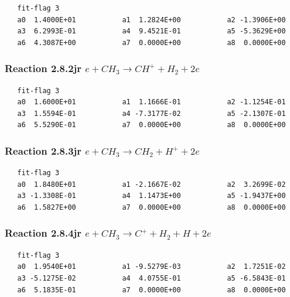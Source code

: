 \documentclass[12pt,dvipdfmx]{article}
\begin{document}
\begin{small}\begin{verbatim}
   fit-flag 3
   a0  1.4000E+01           a1  1.2824E+00           a2 -1.3906E+00
   a3  6.2993E-01           a4  9.4521E-01           a5 -5.3629E+00
   a6  4.3087E+00           a7  0.0000E+00           a8  0.0000E+00
\end{verbatim}\end{small}




\subsubsection{
Reaction 2.8.2jr    $e + CH_{3} \rightarrow CH^{+} + H_{2} + 2e $
}

\begin{small}\begin{verbatim}
   fit-flag 3
   a0  1.6000E+01           a1  1.1666E-01           a2 -1.1254E-01
   a3  1.5594E-01           a4 -7.3177E-02           a5 -2.1307E-01
   a6  5.5290E-01           a7  0.0000E+00           a8  0.0000E+00
\end{verbatim}\end{small}


\subsubsection{
Reaction 2.8.3jr    $e + CH_{3} \rightarrow CH_{2} + H^{+} + 2e $
}

\begin{small}\begin{verbatim}
   fit-flag 3
   a0  1.8480E+01           a1 -2.1667E-02           a2  3.2699E-02
   a3 -1.3308E-01           a4  1.1473E+00           a5 -1.9437E+00
   a6  1.5827E+00           a7  0.0000E+00           a8  0.0000E+00
\end{verbatim}\end{small}


\subsubsection{
Reaction 2.8.4jr    $e + CH_3 \rightarrow C^{+} + H_2 + H + 2e $
}

\begin{small}\begin{verbatim}
   fit-flag 3
   a0  1.9540E+01           a1 -9.5279E-03           a2  1.7251E-02
   a3 -5.1275E-02           a4  4.0755E-01           a5 -6.5843E-01
   a6  5.1835E-01           a7  0.0000E+00           a8  0.0000E+00
\end{verbatim}\end{small}
\end{document}
